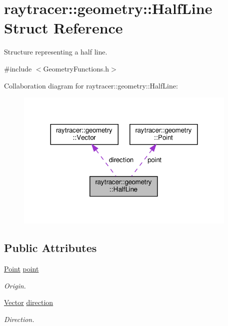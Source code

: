 \hypertarget{structraytracer_1_1geometry_1_1HalfLine}{}\section{raytracer\+:\+:geometry\+:\+:Half\+Line Struct Reference}
\label{structraytracer_1_1geometry_1_1HalfLine}


Structure representing a half line.  




{\ttfamily \#include $<$Geometry\+Functions.\+h$>$}



Collaboration diagram for raytracer\+:\+:geometry\+:\+:Half\+Line\+:\nopagebreak
\begin{figure}[H]
\begin{center}
\leavevmode
\includegraphics[width=300pt]{structraytracer_1_1geometry_1_1HalfLine__coll__graph}
\end{center}
\end{figure}
\subsection*{Public Attributes}
\begin{DoxyCompactItemize}
\item 
\mbox{\label{structraytracer_1_1geometry_1_1HalfLine_a754da5be6d844ecdcd63b8379ff87028}} 
\hyperlink{classraytracer_1_1geometry_1_1Point}{Point} \hyperlink{structraytracer_1_1geometry_1_1HalfLine_a754da5be6d844ecdcd63b8379ff87028}{point}
\begin{DoxyCompactList}\small\item\em Origin. \end{DoxyCompactList}\item 
\mbox{\label{structraytracer_1_1geometry_1_1HalfLine_a34f254a5bebaf618fee9332c18e9cd11}} 
\hyperlink{classraytracer_1_1geometry_1_1Vector}{Vector} \hyperlink{structraytracer_1_1geometry_1_1HalfLine_a34f254a5bebaf618fee9332c18e9cd11}{direction}
\begin{DoxyCompactList}\small\item\em Direction. \end{DoxyCompactList}\end{DoxyCompactItemize}


